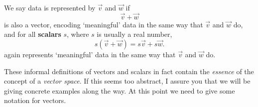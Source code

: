 \documentclass{ximera}
\begin{document}
\begin{definition}
  We say data is represented by  $\vec{v}$ and $\vec{w}$
  if
  \[
  \vec{v}+\vec{w}
  \]
  is also a vector, encoding `meaningful' data in the same way that
  $\vec{v}$ and $\vec{w}$ do, and for all \textbf{scalars} $s$, where
  $s$ is usually a real number,
  \[
  s(\vec{v} + \vec{w}) = s\vec{v}+ s\vec{w}.
  \]
  again represents `meaningful' data in the same way that $\vec{v}$
  and $\vec{w}$ do.
\end{definition}

These informal definitions of vectors and scalars in fact contain the
\textit{essence} of the concept of a \textit{vector space}. If this
seems too abstract, I assure you that we will be giving concrete
examples along the way. At this point we need to give some notation
for vectors.
\end{document}
